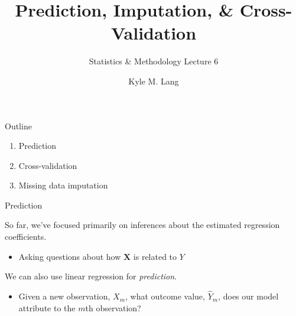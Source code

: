 \documentclass{beamer}\usepackage[]{graphicx}\usepackage[]{color}
\title{Prediction, Imputation, \& Cross-Validation}
\subtitle{Statistics \& Methodology Lecture 6}
\author{Kyle M. Lang}
\institute{Department of Methodology \& Statistics\\Tilburg University}
\date{}
\begin{document}




\begin{frame}[t,plain]
\titlepage
\end{frame}


\begin{frame}{Outline}
  
  \begin{enumerate}
  \item Prediction
    \va
  \item Cross-validation
    \va
  \item Missing data imputation
  \end{enumerate}
  
\end{frame}


\begin{frame}{Prediction}
  
  So far, we've focused primarily on inferences about the estimated regression
  coefficients.  
  \vb
  \begin{itemize}
  \item Asking questions about how $\mathbf{X}$ is related to $Y$
  \end{itemize}
  \vb
  We can also use linear regression for \emph{prediction}.
  \vb
  \begin{itemize}
  \item Given a new observation, $X_m$, what outcome value, $\hat{Y}_m$, does
    our model attribute to the $m$th observation?
  \end{itemize}
  
\end{frame}

\end{document}
